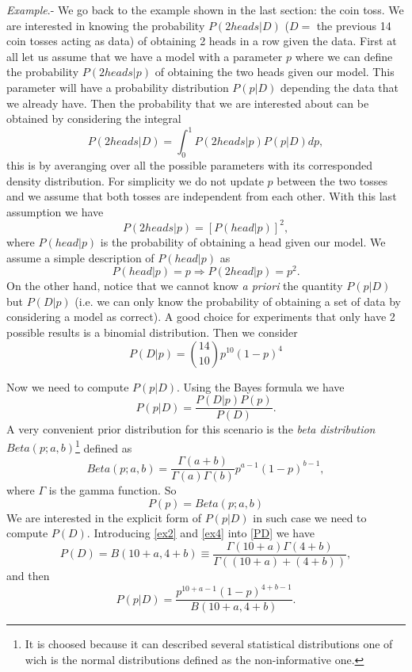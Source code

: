 \documentclass[onecolumn,           %
               showpacs,            %
               preprintnumbers,     %
               aps,                 %
               letterpaper,             %
               superscriptaddress,      %
               nofootinbib,         %
               tightenlines,        %
               floats,floatfix      %
               ,usenatbib,
               ]{revtex4-1}
\begin{document}
\textit{Example}.- We go back to the example shown in the last section: the coin toss. We are interested in knowing the probability $P(2heads|D)$ ($D=$ the previous 14 coin tosses acting as data) of obtaining 2 heads in a row given the data. First at all let us assume that we have a model with a parameter $p$ where we can define the probability $P(2heads|p)$ of obtaining the two heads given our model. This parameter will have a probability distribution $P(p|D)$ depending the data that we already have. Then the probability that we are interested about can be obtained by considering the integral 
\begin{equation}\label{ex}
P(2heads|D)=\int^1_0 P(2heads|p)P(p|D)dp,
\end{equation}
this is by averanging over all the possible parameters with its corresponded density distribution. For simplicity we do not update $p$ between the two tosses and we assume that both tosses are independent from each other. With this last assumption we have
\begin{equation}
P(2heads|p)=[P(head|p)]^2 ,
\end{equation}
where $P(head|p)$ is the probability of obtaining a head given our model. We assume a simple description of $P(head|p)$ as
\begin{equation}\label{ex1}
P(head|p)=p\Rightarrow P(2head|p)=p^2.
\end{equation}
On the other hand, notice that we cannot know \textit{a priori} the quantity $P(p|D)$ but $P(D|p)$ (i.e. we can only know the probability of obtaining a set of data by considering a model as correct). A good choice for experiments that only have 2 possible results is a binomial distribution. Then we consider
\begin{equation}\label{ex2}
P(D|p)=\binom{14}{10}p^{10}(1-p)^4
\end{equation}

Now we need to compute $P(p|D)$. Using the Bayes formula we have
\begin{equation}
P(p|D)=\frac{P(D|p)P(p)}{P(D)}.
\end{equation}
A very convenient prior distribution for this scenario is the \textit{beta distribution} $Beta(p;a,b)$\footnote{It is choosed because it can described several statistical distributions one of wich is the normal distributions defined as the non-informative one.} defined as
\begin{equation}\label{ex3}
Beta(p;a,b)=\frac{\Gamma(a+b)}{\Gamma(a)\Gamma(b)}p^{a-1}(1-p)^{b-1},
\end{equation}
where $\Gamma$ is the gamma function. So
\begin{equation}\label{ex4}
P(p)=Beta(p;a,b)
\end{equation}
We are interested in the explicit form of $P(p|D)$ in such case we need to compute $P(D)$. Introducing \eqref{ex2} and \eqref{ex4} into \eqref{PD} we have
\begin{equation}
P(D)=B(10+a,4+b)\equiv \frac{\Gamma(10+a)\Gamma(4+b)}{\Gamma((10+a)+(4+b))},
\end{equation}
and then
\begin{equation}\label{ex5}
P(p|D)=\frac{p^{10+a-1}(1-p)^{4+b-1}}{B(10+a,4+b)}.
\end{equation}
\end{document}
